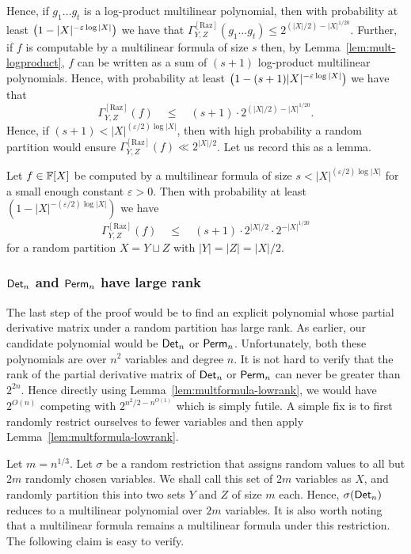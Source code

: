 \documentclass{birkjour}
\newcommand{\CM}[1]{\Gamma^{\mathrm{[#1]}}}
\newcommand{\spaced}[1]{\quad#1\quad}
\renewcommand{\epsilon}{\varepsilon}
\begin{document}
\begin{sloppy}
	Hence, if $g_1\dots g_t$ is a log-product multilinear polynomial, 
	then with probability at least $\inparen{1 - |X|^{-\epsilon \log |X|}}$ 
	we have that $\CM{Raz}_{Y,Z}(g_1\dots g_t) \leq 2^{(|X|/2) - |X|^{1/20}}$. 
	Further, if $f$ is computable by a multilinear formula of size $s$ then, 
	by Lemma~\ref{lem:mult-logproduct}, $f$ can be written as a sum of 
	$(s+1)$ log-product multilinear polynomials. Hence, with probability 
	at least $\inparen{1 - (s+1)|X|^{-\epsilon \log |X|}}$ we have that
		$$\CM{Raz}_{Y,Z}(f) \spaced{\leq} (s+1) \cdot 2^{(|X|/2) - |X|^{1/20}}. $$
	Hence, if $(s+1) < |X|^{(\epsilon/2) \log |X|}$, then with high 
	probability a random partition would ensure 
	$\CM{Raz}_{Y,Z}(f) \ll 2^{|X|/2}$. Let us record this as a lemma.
\end{sloppy}

\begin{lemma}\label{lem:multformula-lowrank}
  Let $f \in \mathbb{F}[X]$ be computed by a multilinear formula of size $s < |X|^{(\epsilon/2) \log |X|}$ for a small enough constant $\epsilon > 0$. Then with probability at least $(1 - |X|^{-(\epsilon/2)\log |X|})$ we have $$\CM{Raz}_{Y,Z}(f) \spaced{\leq} (s+1)\cdot 2^{|X|/2} \cdot 2^{-|X|^{1/20}}$$ for a random partition $X = Y \sqcup Z$ with $|Y| = |Z| = |X|/2$.
\end{lemma}

\subsubsection{$\mathsf{Det}_n$ and $\mathsf{Perm}_n$ have large rank}

The last step of the proof would be to find an explicit polynomial whose partial derivative matrix under a random partition has large rank. As earlier, our candidate polynomial would be $\mathsf{Det}_n$ or $\mathsf{Perm}_n$. Unfortunately, both these polynomials are over $n^2$ variables and degree $n$. It is not hard to verify that the rank of the partial derivative matrix of $\mathsf{Det}_n$ or $\mathsf{Perm}_n$ can never be greater than $2^{2n}$. Hence directly using Lemma~\ref{lem:multformula-lowrank}, we would have $2^{O(n)}$ competing with $2^{n^2/2 - n^{O(1)}}$ which is simply futile. A simple fix is to first randomly restrict ourselves to fewer variables and then apply Lemma~\ref{lem:multformula-lowrank}. 

Let $m = n^{1/3}$. Let $\sigma$ be a random restriction that assigns random values to all but $2m$ randomly chosen variables. We shall call this set of $2m$ variables as $X$, and randomly partition this into two sets $Y$ and $Z$ of size $m$ each. Hence, $\sigma(\mathsf{Det}_n)$ reduces to a multilinear polynomial over $2m$ variables. It is also worth noting that a multilinear formula remains a multilinear formula under this restriction. The following claim is easy to verify. 
\end{document}
